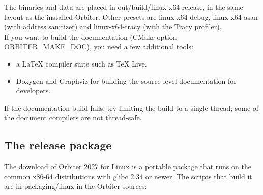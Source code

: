 \documentclass[Orbiter Developer Manual.tex]{subfiles}
\begin{document}
\noindent
The binaries and data are placed in out/build/linux-x64-release, in the same layout as the installed Orbiter. Other presets are linux-x64-debug, linux-x64-asan (with address sanitizer) and linux-x64-tracy (with the Tracy profiler).\\
If you want to build the documentation (CMake option ORBITER\_MAKE\_DOC), you need a few additional tools:

\begin{itemize}
\item a LaTeX compiler suite such as TeX Live.
\item Doxygen and Graphviz for building the source-level documentation for developers.
\end{itemize}

\noindent
If the documentation build fails, try limiting the build to a single thread; some of the document compilers are not thread-safe.


\subsection{The release package}
The download of Orbiter 2027 for Linux is a portable package that runs on the common x86-64 distributions with glibc 2.34 or newer. The scripts that build it are in packaging/linux in the Orbiter sources:
\end{document}
